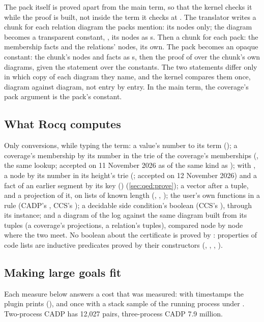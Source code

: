 The pack itself is proved apart from the main term, so that the kernel
checks it while the proof is built, not inside the term it checks at
. The translator writes a chunk for each relation diagram the
packs mention: its nodes only; the diagram becomes a transparent
constant, , its nodes as s. Then a chunk for each
pack: the membership facts and the relations' nodes, its own. The pack
becomes an opaque constant: the chunk's nodes and facts as s,
then the proof of  over the chunk's own diagrams, given the
statement  over the  constants. The two statements
differ only in which copy of each diagram they name, and the kernel
compares them once, diagram against diagram, not entry by entry. In the
main term, the coverage's pack argument is the pack's constant.

\subsection{What Rocq computes}\label{sec:qed:computes}

Only conversions, while typing the term: a value's number to its term
(); a coverage's membership by its number in the trie of the
coverage's memberships (, the same lookup; accepted on 11
November 2026 as of the same kind as ); with , a node by its number in its height's trie (; accepted
on 12 November 2026) and a fact of an earlier segment by its key
() (\cref{sec:qed:prove}); a vector after a
tuple, and a projection of it, on lists of known length (,
, ); the user's own functions in a rule (CADP's
, CCS's ); a decidable side condition's boolean
(CCS's ), through its  instance; and a
diagram of the log against the same diagram built from its tuples (a
coverage's projections, a relation's tuples), compared node by node
where the two meet. No boolean about the certificate is proved by
: properties of code lists are inductive predicates proved
by their constructors (, , ,
).

\subsection{Making large goals fit}\label{sec:qed:fit}

Each measure below answers a cost that was measured: with timestamps
the plugin prints (), and once with a stack
sample of the running process under . Two-process CADP has
12,027 pairs, three-process CADP 7.9 million.

